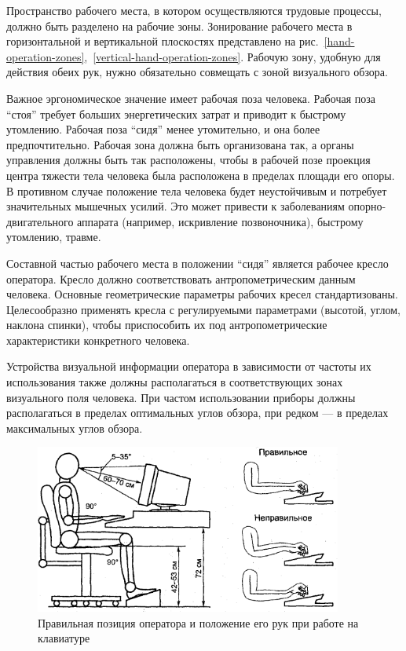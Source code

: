 Пространство рабочего места, в котором осуществляются трудовые процессы, должно быть разделено на рабочие зоны. Зонирование рабочего места в горизонтальной и вертикальной плоскостях представлено на рис.~\ref{hand-operation-zones},~\ref{vertical-hand-operation-zones}. Рабочую зону, удобную для действия обеих рук, нужно обязательно совмещать с зоной визуального обзора.\cite{devisilov09}

Важное эргономическое значение имеет рабочая поза человека. Рабочая поза ``стоя'' требует больших энергетических затрат и приводит к быстрому утомлению. Рабочая поза ``сидя'' менее утомительно, и она более предпочтительно. Рабочая зона должна быть организована так, а органы управления должны быть так расположены, чтобы в рабочей позе проекция центра тяжести тела человека была расположена в пределах площади его опоры. В противном случае положение тела человека будет неустойчивым и потребует значительных мышечных усилий. Это может привести к заболеваниям опорно\hyp{}двигательного аппарата (например, искривление позвоночника), быстрому утомлению, травме.\cite{devisilov09}

Составной частью рабочего места в положении ``сидя'' является рабочее кресло оператора. Кресло должно соответствовать антропометрическим данным человека. Основные геометрические параметры рабочих кресел стандартизованы. Целесообразно применять кресла с регулируемыми параметрами (высотой, углом, наклона спинки), чтобы приспособить их под антропометрические характеристики конкретного человека.\cite{devisilov09}

Устройства визуальной информации оператора в зависимости от частоты их использования также должны располагаться в соответствующих зонах визуального поля человека. При частом использовании приборы должны располагаться в пределах оптимальных углов обзора, при редком --- в пределах максимальных углов обзора.\cite{devisilov09}

\begin{figure}
  \centering
  \includegraphics[width=0.9\textwidth]{images/mihnuk-3-14}
  \caption{Правильная позиция оператора и положение его рук при работе на клавиатуре\label{operator-position}}
\end{figure}

